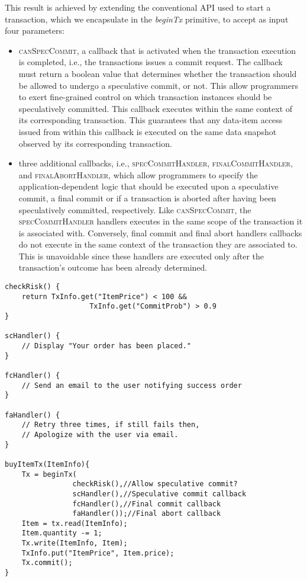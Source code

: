 This result is achieved by extending the conventional API used to start a transaction, which we encapsulate in the \textit{beginTx} primitive, to accept as input four parameters:
\begin{itemize}
\item \textsc{canSpecCommit}, a callback that is activated when the transaction execution is completed, i.e., the transactions issues a commit request. The callback must return a boolean value that determines whether the transaction should be allowed to undergo a speculative commit, or not. This allow programmers to exert fine-grained control on which transaction instances should be speculatively committed.  This callback executes within the same context of its corresponding transaction. This guarantees that any data-item access issued from within this callback is executed on the same data snapshot observed by its corresponding transaction. 
\item three additional callbacks, i.e., \textsc{specCommitHandler}, \textsc{finalCommitHandler}, and \textsc{finalAbortHandler},  which allow  programmers to specify the application-dependent logic that should be executed upon a speculative commit, a final commit or if a transaction is aborted after having been speculatively committed, respectively. Like \textsc{canSpecCommit}, the \textsc{specCommitHandler} handlers executes in the same  scope of the transaction it is associated with. Conversely, final commit and final abort handlers callbacks do not execute in the same context of the transaction they are associated to. This is unavoidable since these handlers are executed only after the transaction's outcome has been already determined. 
\end{itemize}



 
\begin{lstlisting}[caption=Example use case of the proposed programming model.]   
checkRisk() { 
    return TxInfo.get("ItemPrice") < 100 &&
                    TxInfo.get("CommitProb") > 0.9
}

scHandler() {
    // Display "Your order has been placed."
}

fcHandler() {
    // Send an email to the user notifying success order
}

faHandler() {
    // Retry three times, if still fails then,
    // Apologize with the user via email.
}

buyItemTx(ItemInfo){
    Tx = beginTx(
                checkRisk(),//Allow speculative commit?
                scHandler(),//Speculative commit callback
                fcHandler(),//Final commit callback
                faHandler());//Final abort callback
    Item = tx.read(ItemInfo);
    Item.quantity -= 1;
    Tx.write(ItemInfo, Item);
    TxInfo.put("ItemPrice", Item.price);
    Tx.commit();
}
\end{lstlisting}

